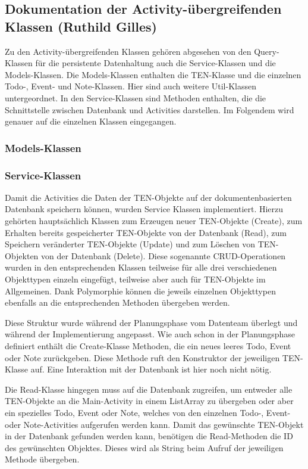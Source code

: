 \newpage
\subsection{Dokumentation der Activity-übergreifenden Klassen (Ruthild Gilles)}

Zu den Activity-übergreifenden Klassen gehören abgesehen von den Query-Klassen für die persistente Datenhaltung auch die Service-Klassen und die Models-Klassen. Die Models-Klassen enthalten die TEN-Klasse und die einzelnen Todo-, Event- und Note-Klassen. Hier sind auch weitere Util-Klassen untergeordnet. In den Service-Klassen sind Methoden enthalten, die die Schnittstelle zwischen Datenbank und Activities darstellen. Im Folgendem wird genauer auf die einzelnen Klassen eingegangen.

\subsubsection{Models-Klassen}



\subsubsection{Service-Klassen}

Damit die Activities die Daten der TEN-Objekte auf der dokumentenbasierten Datenbank speichern können, wurden Service Klassen implementiert. Hierzu gehörten hauptsächlich Klassen zum Erzeugen neuer TEN-Objekte (Create), zum Erhalten bereits gespeicherter TEN-Objekte von der Datenbank (Read), zum Speichern veränderter TEN-Objekte (Update) und zum Löschen von TEN-Objekten von der Datenbank (Delete). Diese sogenannte CRUD-Operationen wurden in den entsprechenden Klassen teilweise für alle drei verschiedenen Objekttypen einzeln eingefügt, teilweise aber auch für TEN-Objekte im Allgemeinen. Dank Polymorphie können die jeweils einzelnen Objekttypen ebenfalls an die entsprechenden Methoden übergeben werden.

Diese Struktur wurde während der Planungsphase vom Datenteam überlegt und während der Implementierung angepasst. Wie auch schon in der Planungsphase definiert enthält die Create-Klasse Methoden, die ein neues leeres Todo, Event oder Note zurückgeben. Diese Methode ruft den Konstruktor der jeweiligen TEN-Klasse auf. Eine Interaktion mit der Datenbank ist hier noch nicht nötig.

Die Read-Klasse hingegen muss auf die Datenbank zugreifen, um entweder alle TEN-Objekte an die Main-Activity in einem ListArray zu übergeben oder aber ein spezielles Todo, Event oder Note, welches von den einzelnen Todo-, Event- oder Note-Activities aufgerufen werden kann. Damit das gewünschte TEN-Objekt in der Datenbank gefunden werden kann, benötigen die Read-Methoden die ID des gewünschten Objektes. Dieses wird als String beim Aufruf der jeweiligen Methode übergeben.

